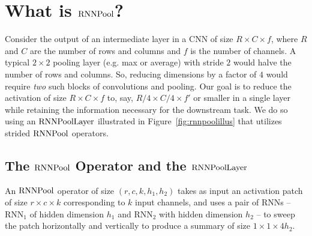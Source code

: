 \documentclass[10pt]{article}
\newcommand{\rpool}{\ensuremath{{\rm RNNPool}}\xspace}
\newcommand{\rpoollayer}{\ensuremath{{\rm RNNPoolLayer}}\xspace}
\begin{document}
 \section{What is \rpool?}
\label{sec:def}

Consider the output of an intermediate layer in a CNN of size $R\times
C \times f$, where $R$ and $C$ are the number of rows and columns and
$f$ is the number of channels. A typical $2\times 2$ pooling layer
(e.g. max or average) with stride $2$ would halve the number of rows
and columns. So, reducing dimensions by a factor of $4$ would
require {\em two} such blocks of convolutions and pooling. Our goal is to reduce the activation of
size $R\times C \times f$ to, say, $R/4 \times C/4 \times f'$ or
smaller in a single layer while retaining the information necessary
for the downstream task. We do so using an \rpoollayer illustrated in
Figure~\ref{fig:rnnpoolillus} that utilizes strided \rpool operators.


\subsection{The \rpool Operator and the \rpoollayer}

An \rpool operator of size $(r,c,k,h_1,h_2)$ takes as input an
activation patch of size $r\times c \times k$ corresponding to $k$
input channels, and uses a pair of RNNs -- $\mathrm{RNN}_1$ of hidden
dimension $h_1$ and $\mathrm{RNN}_2$ with hidden dimension $h_2$ -- to
sweep the patch horizontally and vertically to produce a summary of
size $1\times 1\times 4h_2$.
\end{document}
